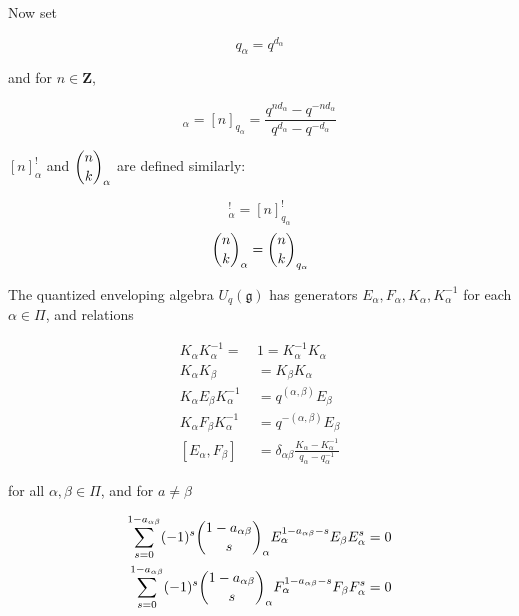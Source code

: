         Now set 

        \begin{equation}
            q_\alpha = q^{d_\alpha}
        \end{equation}

        and for $n \in \mathbf{Z}$,

        \begin{equation}
            [n]_\alpha = [n]_{q_\alpha} = \frac{q^{nd_\alpha} - q^{-nd_\alpha}}{q^{d_\alpha} - q^{-d_\alpha}}
        \end{equation}

        $[n]_\alpha^!$ and $\dbinom{n}{k}_\alpha$ are defined similarly: 
        
        \begin{equation}
            [n]_\alpha^! = [n]_{q_{\alpha}}^!
        \end{equation}
        \begin{equation}
            \dbinom{n}{k}_\alpha = \dbinom{n}{k}_{q_\alpha}
        \end{equation}

        \begin{defn}
            The quantized enveloping algebra $U_q(\mathfrak{g})$ has generators
            $E_\alpha, F_\alpha, K_\alpha, K_\alpha^{-1}$ for each $\alpha \in
            \Pi$, and relations

            \begin{align}
                K_\alpha K_\alpha^{-1} =\ &1  = K_\alpha^{-1}K_\alpha \\
                K_\alpha K_\beta &= K_\beta K_\alpha \\
                K_\alpha E_\beta K_\alpha^{-1} &= q^{(\alpha, \beta)} E_\beta \\
                K_\alpha F_\beta K_\alpha^{-1} &= q^{-(\alpha, \beta)} E_\beta \\
                [E_\alpha, F_\beta] &= \delta_{\alpha\beta} \frac{K_\alpha - K_\alpha^{-1}}{ q_\alpha - q_\alpha^{-1}} 
            \end{align}

            for all $\alpha, \beta \in \Pi$, and for $a \neq \beta$

            \begin{align}
                \sum_{s=0}^{1-a_{\alpha\beta}} (-1)^s \dbinom{1-a_{\alpha\beta}}{s}_\alpha E_\alpha^{1-a_{\alpha\beta} - s} E_\beta E_\alpha^s  &= 0 \\
                \sum_{s=0}^{1-a_{\alpha\beta}} (-1)^s \dbinom{1-a_{\alpha\beta}}{s}_\alpha F_\alpha^{1-a_{\alpha\beta} - s} F_\beta F_\alpha^s  &= 0 
            \end{align}
        \end{defn}
